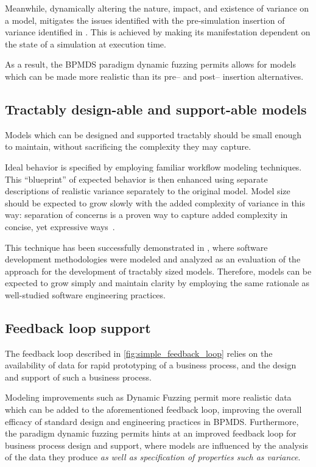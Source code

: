 \documentclass[draft,12pt]{llncs}  %
\begin{document}
Meanwhile, dynamically altering the nature, impact, and existence of variance on
a model, mitigates the issues identified with the pre-simulation insertion of
variance identified in \cite{pourmasoumi2015business}. This is achieved by making its
manifestation dependent on the state of a simulation at execution time.
\par

As a result, the BPMDS paradigm dynamic fuzzing permits allows for models which
can be made more realistic than its pre-- and post-- insertion alternatives.
\par


\subsection{Tractably design-able and support-able models}
Models which can be designed and supported tractably should be small enough to
maintain, without sacrificing the complexity they may capture.
\par

Ideal behavior is specified by employing familiar workflow
modeling techniques. This ``blueprint'' of expected behavior is then enhanced
using separate descriptions of realistic variance separately to the original model. Model
size should be expected to grow slowly with the added complexity of variance in
this way: separation of concerns is a proven way to capture added complexity in
concise, yet expressive ways~\citep{kiczales1997aspect}.
\par

This technique has been successfully demonstrated in \cite{wallis2018modelling},
where software development methodologies were modeled and analyzed as an
evaluation of the approach for the development of tractably sized models.
Therefore, models can be expected to grow simply and maintain clarity by
employing the same rationale as well-studied software engineering practices.
\par

\subsection{Feedback loop support}
The feedback loop described in \cref{fig:simple_feedback_loop} relies on the
availability of data for rapid prototyping of a business process, and the design
and support of such a business process.
\par

Modeling improvements such as Dynamic Fuzzing permit more realistic data which
can be added to the aforementioned feedback loop, improving the overall efficacy
of standard design and engineering practices in BPMDS. Furthermore, the paradigm
dynamic fuzzing permits hints at an improved feedback loop for business process
design and support, where models are influenced by the analysis of the data they
produce \emph{as well as specification of properties such as variance}. 
\par
\end{document}
